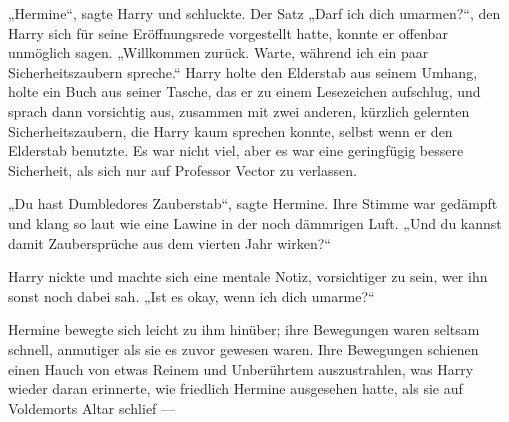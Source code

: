 „Hermine“, sagte Harry und schluckte. Der Satz
„Darf ich dich umarmen?“, den Harry sich für seine Eröffnungsrede vorgestellt hatte, konnte er offenbar unmöglich sagen.
„Willkommen zurück. Warte, während ich ein paar Sicherheitszaubern spreche.“
Harry holte den Elderstab aus seinem Umhang, holte ein Buch aus seiner Tasche, das er zu einem Lesezeichen aufschlug, und sprach dann vorsichtig  aus, zusammen mit zwei anderen, kürzlich gelernten Sicherheitszaubern, die Harry kaum sprechen konnte, selbst wenn er den Elderstab benutzte. Es war nicht viel, aber es war eine geringfügig bessere Sicherheit, als sich nur auf Professor Vector zu verlassen.

„Du hast Dumbledores Zauberstab“, sagte Hermine. Ihre Stimme war gedämpft und klang so laut wie eine Lawine in der noch dämmrigen Luft.
„Und du kannst damit Zaubersprüche aus dem vierten Jahr wirken?“

Harry nickte und machte sich eine mentale Notiz, vorsichtiger zu sein, wer ihn sonst noch dabei sah.
„Ist es okay, wenn ich dich umarme?“

Hermine bewegte sich leicht zu ihm hinüber; ihre Bewegungen waren seltsam schnell, anmutiger als sie es zuvor gewesen waren. Ihre Bewegungen schienen einen Hauch von etwas Reinem und Unberührtem auszustrahlen, was Harry wieder daran erinnerte, wie friedlich Hermine ausgesehen hatte, als sie auf Voldemorts Altar schlief —

